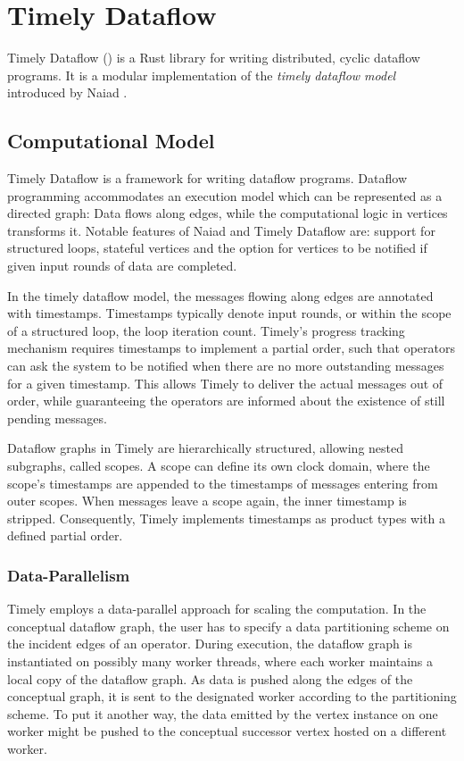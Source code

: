 \chapter{Timely Dataflow}\label{ch:background}

Timely Dataflow \cite{timely} () is a Rust library for writing distributed,
cyclic dataflow programs. It is a modular implementation of the \emph{timely dataflow
model} introduced by Naiad \cite{naiad}. 

\section{Computational Model}

Timely Dataflow is a framework for writing dataflow programs. Dataflow programming
accommodates an execution model which can be represented as a directed graph:
Data flows along edges, while the computational logic in vertices transforms it.
Notable features of Naiad and Timely Dataflow are: support for structured loops,
stateful vertices and the option for vertices to be notified if given input
rounds of data are completed. \cite{naiad}

In the timely dataflow model, the messages flowing along edges are annotated with
timestamps. Timestamps typically denote input rounds, or within the scope of a
structured loop, the loop iteration count. Timely's progress tracking mechanism requires
timestamps to implement a partial order, such that operators can ask the system
to be notified when there are no more outstanding messages for a given timestamp.
This allows Timely to deliver the actual messages out of order, while 
guaranteeing the operators are informed about the existence of still pending
messages.

Dataflow graphs in Timely are hierarchically structured, allowing
nested subgraphs, called scopes. A scope can define its own clock
domain, where the scope's timestamps are appended to the timestamps of messages
entering from outer scopes. When messages leave a scope again, the inner 
timestamp is stripped. Consequently, Timely implements timestamps
as product types with a defined partial order.

\subsection{Data-Parallelism}

Timely employs a data-parallel approach for scaling the computation. In the
conceptual dataflow graph, the user has to specify a data partitioning scheme
on the incident edges of an operator. During execution, the dataflow graph
is instantiated on possibly many worker threads, where each worker maintains
a local copy of the dataflow graph. As data is pushed along the edges of the
conceptual graph, it is sent to the designated worker according to the
partitioning scheme. To put it another way, the data emitted by the vertex
instance on one worker might be pushed to the conceptual successor vertex
hosted on a different worker.

